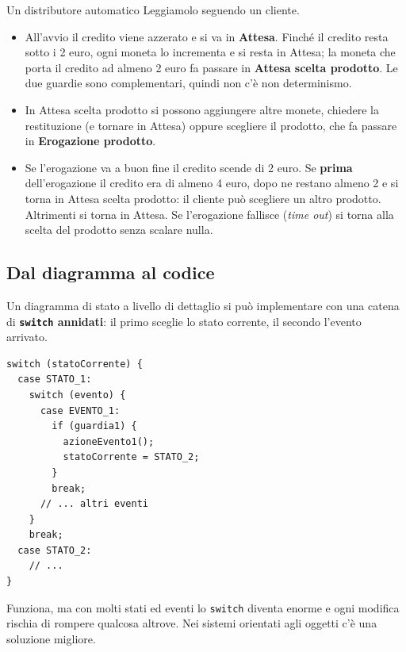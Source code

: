 \begin{esempio}{Un distributore automatico}
Leggiamolo seguendo un cliente.
\begin{itemize}
  \item All'avvio il credito viene azzerato e si va in \textbf{Attesa}. Finché il credito resta sotto i 2 euro, ogni moneta lo
        incrementa e si resta in Attesa; la moneta che porta il credito ad almeno 2 euro fa passare in \textbf{Attesa scelta prodotto}.
        Le due guardie sono complementari, quindi non c'è non determinismo.
  \item In Attesa scelta prodotto si possono aggiungere altre monete, chiedere la restituzione (e tornare in Attesa) oppure
        scegliere il prodotto, che fa passare in \textbf{Erogazione prodotto}.
  \item Se l'erogazione va a buon fine il credito scende di 2 euro. Se \textbf{prima} dell'erogazione il credito era di almeno
        4 euro, dopo ne restano almeno 2 e si torna in Attesa scelta prodotto: il cliente può scegliere un altro prodotto.
        Altrimenti si torna in Attesa. Se l'erogazione fallisce (\textit{time out}) si torna alla scelta del prodotto senza
        scalare nulla.
\end{itemize}
\end{esempio}

\subsection{Dal diagramma al codice}

Un diagramma di stato a livello di dettaglio si può implementare con una catena di \textbf{\texttt{switch} annidati}: il primo sceglie
lo stato corrente, il secondo l'evento arrivato.

\begin{lstlisting}[style=java]
switch (statoCorrente) {
  case STATO_1:
    switch (evento) {
      case EVENTO_1:
        if (guardia1) {
          azioneEvento1();
          statoCorrente = STATO_2;
        }
        break;
      // ... altri eventi
    }
    break;
  case STATO_2:
    // ...
}
\end{lstlisting}

Funziona, ma con molti stati ed eventi lo \texttt{switch} diventa enorme e ogni modifica rischia di rompere qualcosa altrove.
Nei sistemi orientati agli oggetti c'è una soluzione migliore.


